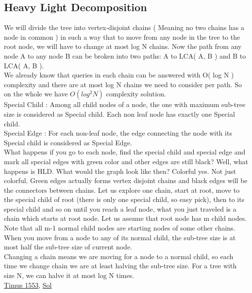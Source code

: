 \documentclass[8pt, a4paper, oneside, twocolumn]{extarticle}
\begin{document}
\subsection{Heavy Light Decomposition}
We will divide the tree into vertex-disjoint chains ( Meaning no two chains has a node in common ) in such a way that to move from any node in the tree to the root node, we will have to change at most log N chains. Now the path from any node A to any node B can be  broken into two paths: A to LCA( A, B ) and B to LCA( A, B ).
\\We already know that queries in each chain can be answered with O( log N ) complexity and there are at most log N chains we need to consider per path. So on the whole we have $O(log^2 N)$ complexity solution.
\\Special Child : Among all child nodes of a node, the one with maximum sub-tree size is considered as Special child. Each non leaf node has exactly one Special child.
\\Special Edge : For each non-leaf node, the edge connecting the node with its Special child is considered as Special Edge.
\\What happens if you go to each node, find the special child and special edge and mark all special edges with green color and other edges are still black? Well, what happens is HLD. What would the graph look like then? Colorful yes. Not just colorful. Green edges actually forms vertex disjoint chains and black edges will be the connectors between chains. Let us explore one chain, start at root, move to the special child of root (there is only one special child, so easy pick), then to its special child and so on until you reach a leaf node, what you just traveled is a chain which starts at root node. Let us assume that root node has m child nodes. Note that all m-1 normal child nodes are starting nodes of some other chains.
\\When you move from a node to any of its normal child, the sub-tree size is at most half the sub-tree size of current node.
\\Changing a chain means we are moving for a node to a normal child, so each time we change chain we are at least halving the sub-tree size. For a tree with size N, we can halve it at most log N times.
\\\href{http://acm.timus.ru/problem.aspx?space=1&num=1553}{Timus 1553}, \href{https://github.com/sourabh2311/Competitive-Programming/blob/master/timus/1553.cpp}{Sol}
\end{document}
